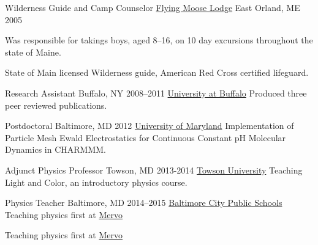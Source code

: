 


\begin{cventries}
  \cventry
    {Wilderness Guide and Camp Counselor} %
    {\href{www.flyingmooselodge.com}{Flying Moose Lodge}} %
    {East Orland, ME} %
    {2005} %
    {
    \begin{cvitems}
      \item {Was responsible for takings boys, aged 8--16, on 10 day excursions throughout the state of Maine.}
      \item {State of Main licensed Wilderness guide, American Red Cross certified lifeguard.}
    \end{cvitems}
    }

  \cventry
    {Research Assistant}
    {Buffalo, NY}
    {2008--2011}
    {\href{www.buffalo.edu}{University at Buffalo}}
	{Produced three peer reviewed publications.}


\cventry
    {Postdoctoral}
    {Baltimore, MD}
    {2012}
    {\href{www.umaryland.edu}{University of Maryland}}
    {Implementation of Particle Mesh Ewald Electrostatics for Continuous Constant pH Molecular Dynamics in CHARMMM.} %

\cventry
    {Adjunct Physics Professor}
    {Towson, MD}
    {2013-2014}
    {\href{www.towson.edu}{Towson University}}
    {Teaching Light and Color, an introductory physics course.}

\cventry
    {Physics Teacher}
    {Baltimore, MD}
    {2014--2015}
    {\href{http://www.baltimorecityschools.org/}{Baltimore City Public Schools}}
    {Teaching physics first at \href{http://mervo.org}{Mervo}}
    {
    \begin{cvitems}
       \item {Teaching physics first at \href{http://mervo.org}{Mervo}}
    \end{cvitems}
    }


\end{cventries}
